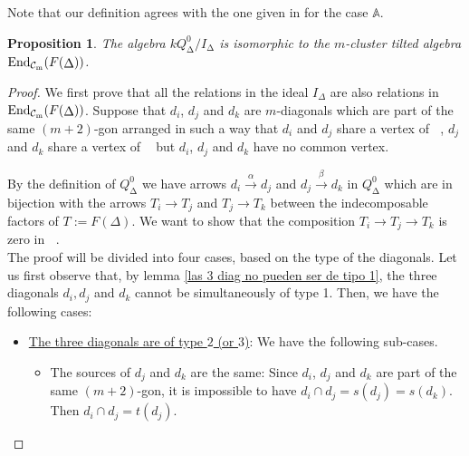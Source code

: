 \documentclass{amsart}
\theoremstyle{plain}
\newtheorem{prop}[teo]{Proposition}
\theoremstyle{definition}
\begin{document}
Note that our definition agrees with the one given in \cite{Murphy2010} for the  case $\mathbb{A}$.\\

\begin{prop}\label{el carcaj con relaciones de End(F(delta))}
The algebra $kQ_{\mathop{\Delta}\nolimits}^0/I_{\mathop{\Delta}\nolimits}$ is isomorphic to the  $m$-cluster tilted algebra ${\mathop{\rm End_{\mathcal{C}_m}}\nolimits}(F({\mathop{\Delta}\nolimits}))$.
\end{prop}

\begin{proof}
We first prove that all the relations in the ideal  $I_{\Delta}$ are also relations in ${\mathop{\rm End_{\mathcal{C}_m}}\nolimits}(F({\mathop{\Delta}\nolimits}))$.
Suppose that  $d_i$, $d_j$ and $d_k$ are  $m$-diagonals which are part of the same  $(m+2)$-gon   arranged in such a way  that  $d_i$ and $d_j$ share a vertex of   ${\mathop{P_{p,q,m}}\nolimits}$, $d_j$ and $d_k$ share a vertex of  ${\mathop{P_{p,q,m}}\nolimits}$ but  $d_i$, $d_j$ and $d_k$ have no common vertex.

By the definition of  $Q_{\mathop{\Delta}\nolimits}^0$ we have arrows  $d_i\stackrel{\alpha}{\rightarrow} d_j$
 and $d_j\stackrel{\beta}{\rightarrow} d_k$ in  $Q_{\mathop{\Delta}\nolimits}^0$ which are in  bijection with the arrows  $T_i\rightarrow T_j$ and $T_j\rightarrow T_k$ between the  indecomposable factors of  $T:=F(\Delta)$. We want to show that the composition $T_i\rightarrow T_j\rightarrow T_k$  is zero in ${\mathop{\mathcal{C}_m}\nolimits}$.\\
The proof will be divided into four cases, based on the type of the  diagonals. Let us first observe that,   by lemma \ref{las 3 diag no pueden ser de tipo 1},  the three diagonals $d_i, d_j$ and  $d_k$ cannot be simultaneously  of  type 1. Then, we have the following cases:\\

\begin{itemize}
  \item [(a)] \underline{The three  diagonals are of  type $2$ (or $3$)}: We have the following sub-cases.\\

\begin{itemize}
  \item [1.] The sources of $d_j$ and $d_k$ are the same: Since $d_i$, $d_j$ and $d_k$  are part of the same  $(m+2)$-gon, it is impossible to have   $d_i\cap d_j= s(d_j)=s(d_k)$. Then $d_i\cap d_j= t(d_j)$.


\end{itemize}
\end{itemize}
\end{proof}
\end{document}

